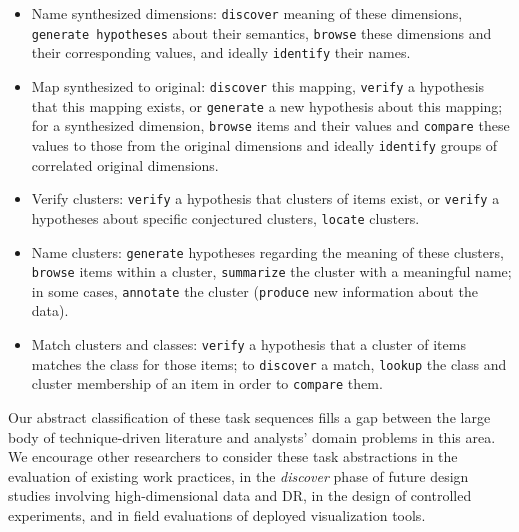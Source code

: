 \begin{itemize}
    \item Name synthesized dimensions: {\tt discover} meaning of these dimensions, {\tt generate hypotheses} about their semantics, {\tt browse} these dimensions and their corresponding values, and ideally {\tt identify} their names.
    \item Map synthesized to original: {\tt discover} this mapping, {\tt verify} a hypothesis that this mapping exists, or {\tt generate} a new hypothesis about this mapping; for a synthesized dimension, {\tt browse} items and their values and {\tt compare} these values to those from the original dimensions and ideally {\tt identify} groups of correlated original dimensions.
    \item Verify clusters: {\tt verify} a hypothesis that clusters of items exist, or {\tt verify} a hypotheses about specific conjectured clusters, {\tt locate} clusters.
    \item Name clusters: {\tt generate} hypotheses regarding the meaning of these clusters, {\tt browse} items within a cluster, {\tt summarize} the cluster with a meaningful name; in some cases, {\tt annotate} the cluster ({\tt produce} new information about the data). 
    \item Match clusters and classes: {\tt verify} a hypothesis that a cluster of items matches the class for those items; to {\tt discover} a match, {\tt lookup} the class and cluster membership of an item in order to {\tt compare} them.
\end{itemize}

Our abstract classification of these task sequences fills a gap between the large body of technique-driven literature and analysts' domain problems in this area.
We encourage other researchers to consider these task abstractions in the evaluation of existing work practices, in the {\it discover} phase of future design studies involving high-dimensional data and \ac{DR}, in the design of controlled experiments, and in field evaluations of deployed visualization tools.

\endinput
